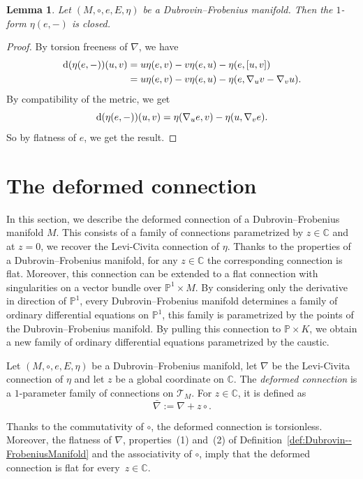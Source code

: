 \documentclass[pdftex]{sigma}
\numberwithin{equation}{section}
\newtheorem{Lemma}[Theorem]{Lemma}
\begin{document}
\begin{Lemma}
 \label{prop:Closedness}
 Let $(M,\circ,e,E,\eta)$ be a Dubrovin--Frobenius manifold. Then the $1$-form $\eta(e,-)$ is closed.
\end{Lemma}
\begin{proof}
 By torsion freeness of $\nabla$, we have
 \begin{align*}
 {\rm d}(\eta(e,-))(u,v)&=u\eta(e,v)-v\eta(e,u)-\eta(e,[u,v])\\
 &=u\eta(e,v)-v\eta(e,u)-\eta(e,\nabla_{u}v-\nabla_{v}u).
 \end{align*}
 By compatibility of the metric, we get
 \begin{equation*}
 {\rm d}(\eta(e,-))(u,v)=\eta(\nabla_{u}e,v)-\eta(u,\nabla_{v}e).
 \end{equation*}
 So by flatness of $e$, we get the result.
\end{proof}

\section{The deformed connection}
\label{sec:DeformedConnection}
In this section, we describe the deformed connection of a Dubrovin--Frobenius manifold $M$. This consists of a family of connections parametrized by $z\in\mathbb{C}$ and at $z=0$, we recover the Levi-Civita connection of $\eta$. Thanks to the properties of a Dubrovin--Frobenius manifold, for any $z\in\mathbb{C}$ the corresponding connection is flat. Moreover, this connection can be extended to a flat connection with singularities on a vector bundle over $\mathbb{P}^{1}\times M$. By considering only the derivative in direction of $\mathbb{P}^{1}$, every Dubrovin--Frobenius manifold determines a family of ordinary differential equations on $\mathbb{P}^{1}$, this family is parametrized by the points of the Dubrovin--Frobenius manifold. By pulling this connection to $\mathbb{P}\times K$, we obtain a new family of ordinary differential equations parametrized by the caustic.

\begin{Definition}
 Let $(M,\circ,e,E,\eta)$ be a Dubrovin--Frobenius manifold, let $\nabla$ be the Levi-Civita connection of $\eta$ and let $z$ be a global coordinate on $\mathbb{C}$. The \emph{deformed connection} is a $1$-parameter family of connections on $\mathcal{T}_{M}$. For $z\in\mathbb{C}$, it is defined as
 \begin{equation*}
 \bar{\nabla}:=\nabla + z\circ.
 \end{equation*}
\end{Definition}
Thanks to the commutativity of $\circ$, the deformed connection is torsionless. Moreover, the flatness of $\nabla$, properties~(1) and~(2) of Definition~\ref{def:Dubrovin--FrobeniusManifold} and the associativity of $\circ$, imply that the deformed connection is flat for every~$z\in\mathbb{C}$.
\end{document}
